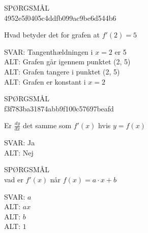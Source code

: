\documentclass[]{article}
\newenvironment{question}[2]{SPØRGSMÅL\\}{\hspace{50px}}
\newcommand{\answer}[1]{{\color{green} SVAR: #1}\\}
\newcommand{\alt}[1]{{\color{red} ALT: #1}\\}
\begin{document}
	\begin{question}{multi}\id{4952e5f0405c4ddfb099ac9be6d544b6}
		
		Hvad betyder det for grafen at $f'(2)=5$
		
		\answer{Tangenthældningen i $x=2$ er 5}
		\alt{Grafen går igennem punktet (2, 5)}
		\alt{Grafen tangere i punktet (2, 5)}
		\alt{Grafen er konstant i $x=2$}
		
	\end{question}

    \begin{question}{multi}\id{f3f783ba31874abb9f100c57697beafd}
		
		Er $\frac{dy}{dx}$ det samme som $f'(x)$ hvis $y=f(x)$
		
		\answer{Ja}
		\alt{Nej}
		
	\end{question}

    \begin{question}{multi}
		
		Hvad er $f'(x)$ når $f(x)=a\cdot x + b$
		
		\answer{$a$}
		\alt{$a x$}
		\alt{$b$}
		\alt{$1$}
		
	\end{question}
\end{document}
